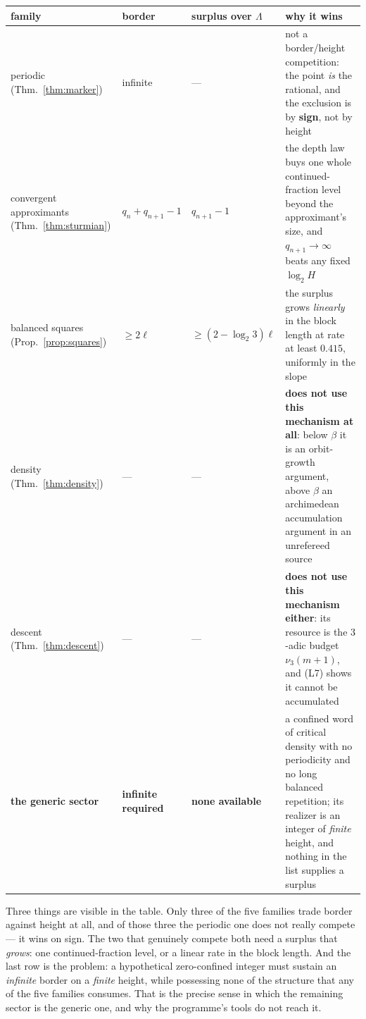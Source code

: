 \documentclass[11pt,reqno]{amsart}
\theoremstyle{plain}
\theoremstyle{definition}
\newcommand{\vth}{\nu_3}
\begin{document}
\begin{center}\small
\begin{tabular}{@{}p{}llp{}@{}}
\toprule
family & border & surplus over $\Lambda$ & why it wins\\
\midrule
periodic (Thm.~\ref{thm:marker})
& infinite
& ---
& not a border/height competition: the point \emph{is} the rational, and the
exclusion is by \textbf{sign}, not by height\\[4pt]
convergent approximants (Thm.~\ref{thm:sturmian})
& $q_n+q_{n+1}-1$
& $q_{n+1}-1$
& the depth law buys one whole continued-fraction level beyond the approximant's
size, and $q_{n+1}\to\infty$ beats any fixed $\log_2 H$\\[4pt]
balanced squares (Prop.~\ref{prop:squares})
& $\ge 2\ell$
& $\ge (2-\log_2 3)\ell$
& the surplus grows \emph{linearly} in the block length at rate at least
$0.415$, uniformly in the slope\\[4pt]
density (Thm.~\ref{thm:density})
& ---
& ---
& \textbf{does not use this mechanism at all}: below $\beta$ it is an
orbit-growth argument, above $\beta$ an archimedean accumulation argument in an
unrefereed source\\[4pt]
descent (Thm.~\ref{thm:descent})
& ---
& ---
& \textbf{does not use this mechanism either}: its resource is the $3$-adic
budget $\vth(m+1)$, and (L7) shows it cannot be accumulated\\[4pt]
\midrule
\textbf{the generic sector}
& \textbf{infinite required}
& \textbf{none available}
& a confined word of critical density with no periodicity and no long balanced
repetition; its realizer is an integer of \emph{finite} height, and nothing in
the list supplies a surplus\\
\bottomrule
\end{tabular}
\end{center}

\medskip
\noindent Three things are visible in the table. Only three of the five families
trade border against height at all, and of those three the periodic one does not
really compete --- it wins on sign. The two that genuinely compete both need a
surplus that \emph{grows}: one continued-fraction level, or a linear rate in the
block length. And the last row is the problem: a hypothetical zero-confined
integer must sustain an \emph{infinite} border on a \emph{finite} height, while
possessing none of the structure that any of the five families consumes. That is
the precise sense in which the remaining sector is the generic one, and why the
programme's tools do not reach it.
\end{document}
